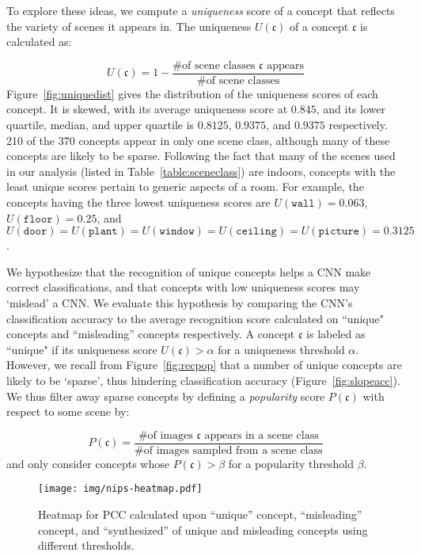 \documentclass{article}
\begin{document}
To explore these ideas, we compute a {\em uniqueness} score of a concept that 
reflects the variety of scenes it appears in. 
The uniqueness $U(\mathfrak{c})$ of a concept $\mathfrak{c}$ is calculated as:
 
$$U(\mathfrak{c}) = 1-\frac{\text{\# of scene classes $\mathfrak{c}$ appears}}{\text{\# of scene classes}}$$
Figure~\ref{fig:uniquedist} gives the distribution of the uniqueness scores of each concept.
It is skewed, with its average uniqueness score at $0.845$, and its lower quartile, median, and upper quartile
is $0.8125$, $0.9375$, and $0.9375$ respectively.
210 of the 370 concepts appear in only one scene class, although many of these concepts are likely to be sparse. Following the fact that many
of the scenes used in our analysis (listed in Table~\ref{table:sceneclass}) are indoors, concepts
with the least unique scores pertain to generic aspects of a room. For example, the 
concepts having the three lowest uniqueness scores are $U(\mathtt{wall}) = 0.063$, 
$U(\mathtt{floor}) = 0.25$, and $U(\mathtt{door}) = U(\mathtt{plant}) = U(\mathtt{window}) = U(\mathtt{ceiling}) = U(\mathtt{picture}) = 0.3125$. 

We hypothesize that the recognition of unique concepts helps a CNN make correct classifications, 
and that concepts with low uniqueness scores may `mislead' a CNN. We evaluate this hypothesis
by comparing the CNN's classification accuracy to the average recognition score calculated on ``unique" concepts and ``misleading'' concepts respectively. A concept $\mathfrak{c}$ is labeled as ``unique" if its uniqueness score $U(\mathfrak{c}) > \alpha$ for a uniqueness threshold $\alpha$. 
However, we recall from Figure~\ref{fig:recpop} that a number
of unique concepts are likely to be `sparse', thus hindering classification accuracy (Figure~\ref{fig:slopeacc}). We thus filter away sparse concepts by defining a {\em popularity} score
$P(\mathfrak{c})$ with respect to some scene by: 

$$P(\mathfrak{c}) = \frac{\text{\# of images $\mathfrak{c}$ appears in a scene class}}{\text{\# of images sampled from a scene class}}$$
and only consider concepts whose $P(\mathfrak{c}) > \beta$ for a popularity threshold $\beta$. 

\begin{figure}[h]
  \centering
  \texttt{[image: img/nips-heatmap.pdf]}
  \caption{Heatmap for PCC calculated upon ``unique'' concept, ``misleading'' concept, and ``synthesized'' of unique and misleading concepts using different thresholds.}
  \label{fig:nips-heatmap}
\end{figure}
\end{document}
